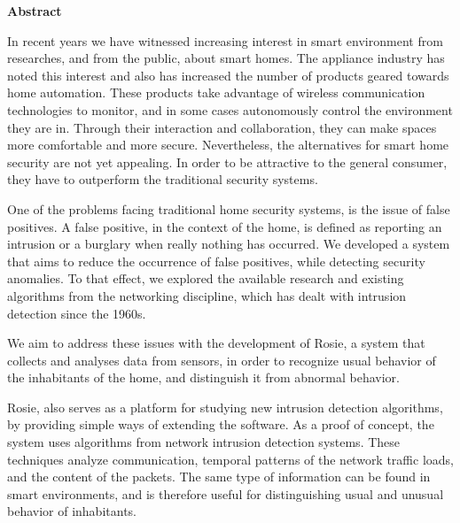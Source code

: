 

\clearemptydoublepage
{}
{}	

\vspace*{2cm}
\begin{center}
{\Large \bf Abstract}
\end{center}
\vspace{1cm}


In recent years we have witnessed increasing interest in smart environment from researches, and from the public, about smart homes. The appliance industry has noted this interest and also has increased the number of products geared towards home automation.
These products take advantage of wireless communication technologies to monitor, and in some cases autonomously control the environment they are in. Through their interaction and collaboration, they can make spaces more comfortable and more secure. Nevertheless, the alternatives for smart home security are not yet appealing. In order to be attractive to the general consumer, they have to outperform the traditional security systems. 

One of the problems facing traditional home security systems, is the issue of false positives. A false positive, in the context of the home, is defined as reporting an intrusion or a burglary when really nothing has occurred. We developed a system that aims to reduce the occurrence of false positives, while detecting security anomalies. To that effect, we explored the available research and existing algorithms from the networking discipline, which has dealt with intrusion detection since the 1960s. 

We aim to address these issues with the development of Rosie, a system that collects and analyses data from sensors, in order to recognize usual behavior of the inhabitants of the home, and distinguish it from abnormal behavior. 

Rosie, also serves as a platform for studying new intrusion detection algorithms, by providing simple ways of extending the software. As a proof of concept, the system uses algorithms from network intrusion detection systems. These techniques analyze communication, temporal patterns of the network traffic loads, and the content of the packets. The same type of information can be found in smart environments, and is therefore useful for distinguishing usual and unusual behavior of inhabitants.

